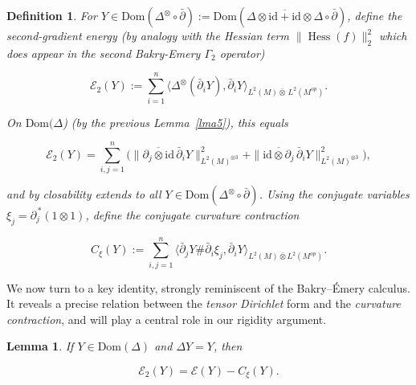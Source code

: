 \documentclass[10pt,a4paper,reqno]{amsart}
\newtheorem{lemma}[theorem]{Lemma}
\newtheorem{definition}[theorem]{Definition}
\DeclareMathOperator{\Hess}{Hess}
\newcommand{\Dom}{\mathrm{Dom}}
\begin{document}
\begin{definition}
For $Y\in \Dom({\Delta^{\otimes}}\circ \bar\partial):=\Dom(\overline{\Delta\otimes \mathrm{id}+\mathrm{id}\otimes \Delta}\circ \bar\partial)$, define the \emph{second-gradient energy} (by analogy with the Hessian term $\lVert \Hess (f)\rVert_2^2$ which does appear in the second Bakry-Emery $\Gamma_2$ operator)


\[
\mathcal E_2(Y) := \sum_{i=1}^n \big\langle \Delta^{\otimes}(\bar\partial_i Y), \bar\partial_i Y\big\rangle_{L^2(M){\bar\otimes}\,L^2(M^{op})}.
\]


On $\Dom(\Delta$) (by the previous Lemma~\ref{lma5}), this equals


\[
\mathcal E_2(Y)
=
\sum_{i,j=1}^n
\Big(
\|\overline{\partial_j\otimes\mathrm{id}}\, \bar\partial_i Y\|_{L^2(M)^{\otimes 3}}^2
+
\|\overline{\mathrm{id}\otimes\partial_j}\,\bar \partial_i Y\|_{L^2(M)^{\otimes 3}}^2
\Big),
\]


and by closability extends to all $Y\in \Dom(\Delta^{\otimes}\circ \bar \partial)$.
Using the conjugate variables $\xi_j=\partial_j^{\,*}(1\otimes 1)$, define the \emph{conjugate curvature contraction}


\[
C_\xi(Y) := \sum_{i,j=1}^n \big\langle \bar\partial_j Y\# \bar\partial_i \xi_j, \bar\partial_i Y\big\rangle_{L^2(M){\bar\otimes} L^2(M^{op})}.
\]


\end{definition}

\begin{flushleft}
We now turn to a key identity, strongly reminiscent of the Bakry--\'Emery calculus. 
It reveals a precise relation between the \emph{tensor Dirichlet} form and the \emph{curvature contraction}, 
and will play a central role in our rigidity argument.
\end{flushleft}


\begin{lemma}\label{lem:one-line-Delta}
If $Y\in \Dom(\Delta)$ and $\Delta Y=Y$, then


\[
\mathcal E_2(Y)= \mathcal{E}(Y)- C_\xi(Y).
\]


\end{lemma}
\end{document}
